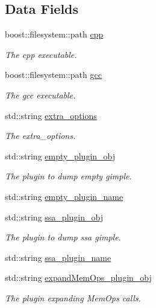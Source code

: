 \subsection*{Data Fields}
\begin{DoxyCompactItemize}
\item 
boost\+::filesystem\+::path \hyperlink{classGccWrapper_1_1Compiler_a4e329ee75488399236f1defbb2499f1f}{cpp}
\begin{DoxyCompactList}\small\item\em The cpp executable. \end{DoxyCompactList}\item 
boost\+::filesystem\+::path \hyperlink{classGccWrapper_1_1Compiler_a7934275f18e27026b1d168d5d428c164}{gcc}
\begin{DoxyCompactList}\small\item\em The gcc executable. \end{DoxyCompactList}\item 
std\+::string \hyperlink{classGccWrapper_1_1Compiler_abeafe5252ef30150b5cbf498fc9b160a}{extra\+\_\+options}
\begin{DoxyCompactList}\small\item\em The extra\+\_\+options. \end{DoxyCompactList}\item 
std\+::string \hyperlink{classGccWrapper_1_1Compiler_ab147411926219a546074efa4f3a5f17d}{empty\+\_\+plugin\+\_\+obj}
\begin{DoxyCompactList}\small\item\em The plugin to dump empty gimple. \end{DoxyCompactList}\item 
std\+::string \hyperlink{classGccWrapper_1_1Compiler_afed1a39beacf6fa1a9bf9a796f06f2c8}{empty\+\_\+plugin\+\_\+name}
\item 
std\+::string \hyperlink{classGccWrapper_1_1Compiler_a14b2777714bcfeb0f7ebd14179411408}{ssa\+\_\+plugin\+\_\+obj}
\begin{DoxyCompactList}\small\item\em The plugin to dump ssa gimple. \end{DoxyCompactList}\item 
std\+::string \hyperlink{classGccWrapper_1_1Compiler_ae4c7ba84eedc7909f98fa41388d6321b}{ssa\+\_\+plugin\+\_\+name}
\item 
std\+::string \hyperlink{classGccWrapper_1_1Compiler_a1a5fa1148e0c375a654405e8987c4965}{expand\+Mem\+Ops\+\_\+plugin\+\_\+obj}
\begin{DoxyCompactList}\small\item\em The plugin expanding Mem\+Ops calls. \end{DoxyCompactList}\item 

\end{DoxyCompactItemize}
